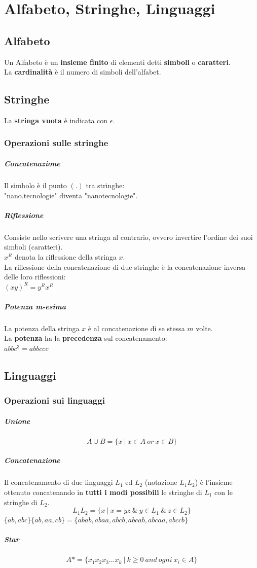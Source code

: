 \documentclass[12pt]{article}
\begin{document}
\section{Alfabeto, Stringhe, Linguaggi}
\subsection{Alfabeto}
Un Alfabeto è un \textbf{insieme finito} di elementi detti \textbf{simboli} o \textbf{caratteri}.\\
La \textbf{cardinalità} è il numero di simboli dell'alfabet.
\subsection{Stringhe}
La \textbf{stringa vuota} è indicata con $\epsilon$.
\subsubsection{Operazioni sulle stringhe}
\subparagraph{Concatenazione}
Il simbolo è il punto $(.)$ tra stringhe:\\
"nano.tecnologie" diventa "nanotecnologie".
\subparagraph{Riflessione}
Consiste nello scrivere una stringa al contrario, ovvero invertire l'ordine dei suoi simboli (caratteri).\\
$x^R$ denota la riflessione della stringa $x$.\\
La riflessione della concatenazione di due stringhe è la concatenazione inversa delle loro riflessioni:\\
$(xy)^R=y^Rx^R$
\subparagraph{Potenza m-esima}
La potenza della stringa $x$ è al concatenazione di se stessa $m$ volte.\\
La \textbf{potenza} ha la \textbf{precedenza} sul concatenamento:\\
$abbc^3 = abbccc$
\subsection{Linguaggi}
\subsubsection{Operazioni sui linguaggi}
\subparagraph{Unione}
\begin{equation*}
    A\cup B = \{x\ |\ x\in A\ or\ x\in B\}
\end{equation*}
\subparagraph{Concatenazione}
Il concatenamento di due linguaggi $L_1$ ed $L_2$ (notazione $L_1L_2$) è l'insieme ottenuto
concatenando in \textbf{tutti i modi possibili} le stringhe di $L_1$ con le stringhe di $L_2$.
\begin{equation*}
    L_1L_2=\{x\ |\ x=yz\ \&\ y \in L_1\ \&\ z \in L_2\}
\end{equation*}
$\{ab,abc\}\{ab,aa,cb\}=\{abab,abaa,abcb,abcab,abcaa,abccb\}$
\subparagraph{Star}
\begin{equation*}
    A*=\{x_1x_2x_3\dots x_k\ |\ k\geq 0\ and\ ogni\ x_i \in A\}
\end{equation*}
\newpage
\end{document}
